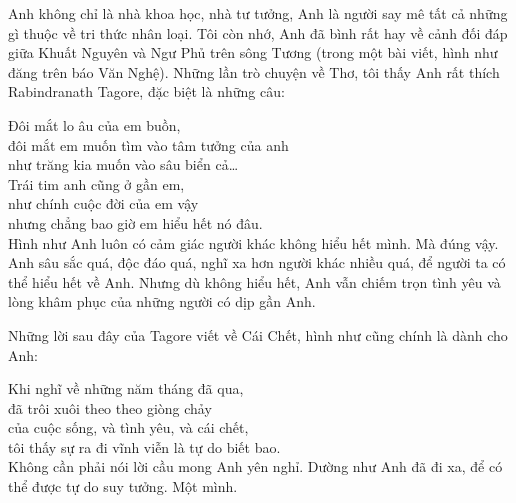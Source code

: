 Anh không chỉ là nhà khoa học, nhà tư tưởng, Anh là người say mê tất cả những gì thuộc về tri thức nhân loại. Tôi còn nhớ, Anh đã bình rất hay về cảnh đối đáp giữa Khuất Nguyên và Ngư Phủ trên sông Tương (trong một bài viết, hình như đăng trên báo Văn Nghệ). Những lần trò chuyện về Thơ, tôi thấy Anh rất thích Rabindranath Tagore, đặc biệt là những câu:

Đôi mắt lo âu của em buồn,\\
đôi mắt em muốn tìm vào tâm tưởng của anh\\
như trăng kia muốn vào sâu biển cả…\\

Trái tim anh cũng ở gần em,\\
như chính cuộc đời của em vậy\\
nhưng chẳng bao giờ em hiểu hết nó đâu.\\

Hình như Anh luôn có cảm giác người khác không hiểu hết mình. Mà đúng vậy. Anh sâu sắc quá, độc đáo quá, nghĩ xa hơn người khác nhiều quá, để người ta có thể hiểu hết về Anh. Nhưng dù không hiểu hết, Anh vẫn chiếm trọn tình yêu và lòng khâm phục của những người có dịp gần Anh.

Những lời sau đây của Tagore viết về Cái Chết, hình như cũng chính là dành cho Anh:

Khi nghĩ về những năm tháng đã qua,\\
đã trôi xuôi theo theo giòng chảy\\
của cuộc sống, và tình yêu, và cái chết,\\
tôi thấy sự ra đi vĩnh viễn là tự do biết bao.\\

Không cần phải nói lời cầu mong Anh yên nghỉ. Dường như Anh đã đi xa, để có thể được tự do suy tưởng. Một mình.
